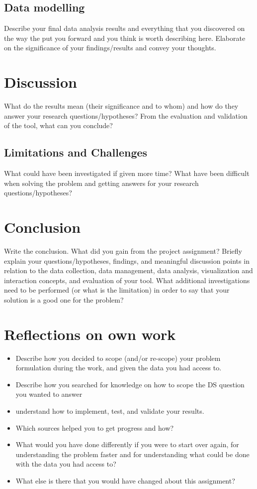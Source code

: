 \subsection{Data modelling}
\label{sec:data}
Describe your final data analysis results and everything that you discovered on the way the put you forward and you think is worth describing here.
Elaborate on the significance of your findings/results and convey your thoughts. 


\section{Discussion}
\label{chap:discussion}
What do the results mean (their significance and to whom) and how do they answer your research questions/hypotheses? 
From the evaluation and validation of the tool, what can you conclude? 

\subsection{Limitations and Challenges}
\label{sec:limitation}
What could have been investigated if given more time? What have been difficult when solving the problem and getting answers for your research questions/hypotheses?

\section{Conclusion}
\label{chap:conclusion}
Write the conclusion. What did you gain from the project assignment? Briefly explain your questions/hypotheses, findings, and meaningful discussion points in relation to the data collection, data management, data analysis, visualization and interaction concepts, and evaluation of your tool.
What additional investigations need to be performed (or what is the limitation) in order to say that your solution is a good one for the problem? 

\section{Reflections on own work}
\label{chap:reflection}
\begin{itemize}
    \item Describe how you decided to scope (and/or re-scope) your problem formulation during the work, and given the data you had access to.
    \item Describe how you searched for knowledge on how to scope the DS question you wanted to answer 
    \item understand how to implement, test, and validate your results. 
    \item Which sources helped you to get progress and how?
    \item What would you have done differently if you were to start over again, for understanding the problem faster and for understanding what could be done with the data you had access to?
    \item What else is there that you would have changed about this assignment?
\end{itemize}

\newpage